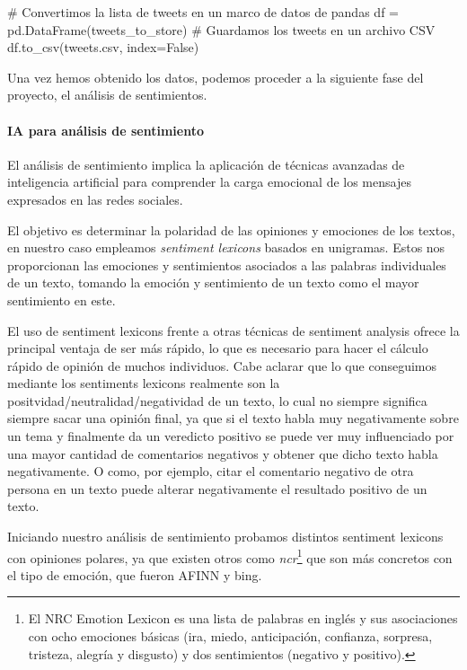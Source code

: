 \documentclass[
  letterpaper,
  DIV=11,
  numbers=noendperiod]{scrartcl}
\let\oldparagraph\paragraph
\renewcommand{\paragraph}[1]{\oldparagraph{#1}\mbox{}}
\newenvironment{Shaded}{\begin{snugshade}}{\end{snugshade}}
\newcommand{\CommentTok}[1]{\textcolor[rgb]{0.37,0.37,0.37}{#1}}
\newcommand{\NormalTok}[1]{\textcolor[rgb]{0.00,0.23,0.31}{#1}}
\newcommand{\OperatorTok}[1]{\textcolor[rgb]{0.37,0.37,0.37}{#1}}
\newcommand{\StringTok}[1]{\textcolor[rgb]{0.13,0.47,0.30}{#1}}
\newcommand{\VariableTok}[1]{\textcolor[rgb]{0.07,0.07,0.07}{#1}}
\begin{document}
\begin{Shaded}
\begin{Highlighting}[]
\CommentTok{\# Convertimos la lista de tweets en un marco de datos de pandas}
\NormalTok{df }\OperatorTok{=}\NormalTok{ pd.DataFrame(tweets\_to\_store)}
\CommentTok{\# Guardamos los tweets en un archivo CSV}
\NormalTok{df.to\_csv(}\StringTok{\textquotesingle{}tweets.csv\textquotesingle{}}\NormalTok{, index}\OperatorTok{=}\VariableTok{False}\NormalTok{)}
\end{Highlighting}
\end{Shaded}

Una vez hemos obtenido los datos, podemos proceder a la siguiente fase
del proyecto, el análisis de sentimientos.

\paragraph{IA para análisis de
sentimiento}\label{ia-para-anuxe1lisis-de-sentimiento}

El análisis de sentimiento implica la aplicación de técnicas avanzadas
de inteligencia artificial para comprender la carga emocional de los
mensajes expresados en las redes sociales.

El objetivo es determinar la polaridad de las opiniones y emociones de
los textos, en nuestro caso empleamos \emph{sentiment lexicons} basados
en unigramas. Estos nos proporcionan las emociones y sentimientos
asociados a las palabras individuales de un texto, tomando la emoción y
sentimiento de un texto como el mayor sentimiento en este.

El uso de sentiment lexicons frente a otras técnicas de sentiment
analysis ofrece la principal ventaja de ser más rápido, lo que es
necesario para hacer el cálculo rápido de opinión de muchos individuos.
Cabe aclarar que lo que conseguimos mediante los sentiments lexicons
realmente son la positvidad/neutralidad/negatividad de un texto, lo cual
no siempre significa siempre sacar una opinión final, ya que si el texto
habla muy negativamente sobre un tema y finalmente da un veredicto
positivo se puede ver muy influenciado por una mayor cantidad de
comentarios negativos y obtener que dicho texto habla negativamente. O
como, por ejemplo, citar el comentario negativo de otra persona en un
texto puede alterar negativamente el resultado positivo de un texto.

Iniciando nuestro análisis de sentimiento probamos distintos sentiment
lexicons con opiniones polares, ya que existen otros como
\emph{ncr}\footnote{El NRC Emotion Lexicon es una lista de palabras en inglés y sus asociaciones con ocho emociones básicas (ira, miedo, anticipación, confianza, sorpresa, tristeza, alegría y disgusto) y dos sentimientos (negativo y positivo).}
que son más concretos con el tipo de emoción, que fueron AFINN y bing.
\end{document}
